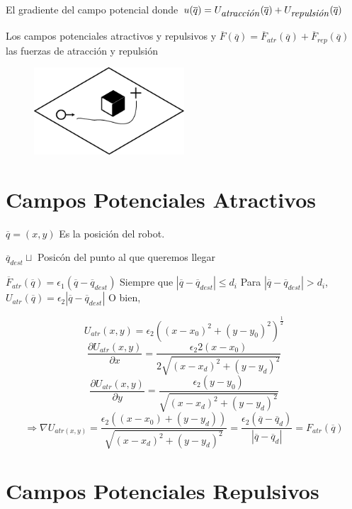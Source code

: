 El gradiente del campo potencial donde  $u(\overline{q}) = U_{\mbox{\textit{atracción}}}(\overline{q}) + U_{\mbox{\textit{repulsión}}}(\overline{q})$

Los campos potenciales atractivos y repulsivos y  $\overline{F}(\overline{q}) = \overline{F}_{atr}(\overline{q}) + \overline{F}_{rep}(\overline{q})$ las fuerzas de atracción y repulsión

\begin{figure}[h!]
	\centering
	\includegraphics[width=0.5\textwidth]{images/img14.png}
	\label{figura14}
\end{figure}



\section{Campos Potenciales Atractivos}

$\overline{q} = (x,y)$ Es la posición del robot.

$\overline{q}_{dest} \sqcup$ Posicón del punto al que queremos llegar

$\overline{F}_{atr}(\overline{q}) = \epsilon_{1} (\overline{q} - \overline{q}_{dest})$ Siempre que $\left| \overline{q} - \overline{q}_{dest} \right| \leq d_{i}$ Para $\left| \overline{q} - \overline{q}_{dest} \right| > d_{i}$, $U_{atr}(\overline{q}) = \epsilon_{2} \left| \overline{q} - \overline{q}_{dest} \right|$ O bien, 

$$U_{atr}(x,y) = \epsilon_{2} \left( (x - x_{0})^2 + (y - y_{0})^2 \right)^\frac{1}{2}
$$ 
$$\dfrac{\partial U_{atr}(x,y)}{\partial x} = \dfrac{\epsilon_{2}2(x - x_{0})}{2\sqrt{(x - x_{d})^2 + (y - y_{d})^2}}
$$
$$\dfrac{\partial U_{atr}(x,y)}{\partial y} = \dfrac{\epsilon_{2}(y - y_{0})}{\sqrt{(x - x_{d})^2 + (y - y_{d})^2}}
$$
$$\Rightarrow \nabla U_{atr(x,y)} = \dfrac{\epsilon_{2}\left( (x - x_{0}) + (y - y_{d})\right) }{\sqrt{(x - x_{d})^2 + (y - y_{d})^2}} = \dfrac{\epsilon_{2}(\overline{q} - \overline{q}_d)}{\left| \overline{q} - \overline{q}_{d} \right|} = F_{atr}(\overline{q})
$$



\section{Campos Potenciales Repulsivos}

